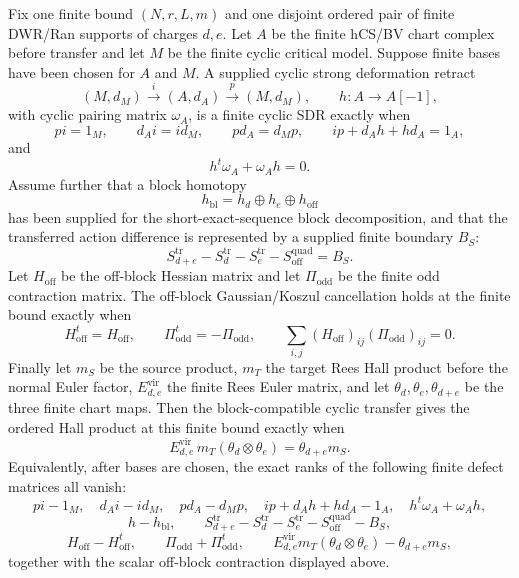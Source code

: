 \begin{proposition}
\label{prop:finite-cyclic-sdr-block-compatibility-gate}
Fix one finite bound \((N,r,L,m)\) and one disjoint ordered pair of
finite DWR/Ran supports of charges \(d,e\). Let \(A\) be the finite
hCS/BV chart complex before transfer and let \(M\) be the finite cyclic
critical model. Suppose finite bases have been chosen for \(A\) and
\(M\). A supplied cyclic strong deformation retract
\[
(M,d_M)
\xrightarrow{\ i\ }
(A,d_A)
\xrightarrow{\ p\ }
(M,d_M),
\qquad
h\colon A\to A[-1],
\]
with cyclic pairing matrix \(\omega_A\), is a finite cyclic SDR exactly
when
\[
pi=1_M,\qquad d_A i=i d_M,\qquad p d_A=d_M p,
\qquad ip+d_Ah+hd_A=1_A,
\]
and
\[
h^{t}\omega_A+\omega_Ah=0.
\]
Assume further that a block homotopy
\[
h_{\mathrm{bl}}=h_d\oplus h_e\oplus h_{\mathrm{off}}
\]
has been supplied for the short-exact-sequence block decomposition,
and that the transferred action difference is represented by a supplied
finite boundary \(B_S\):
\[
S_{d+e}^{\mathrm{tr}}-S_d^{\mathrm{tr}}-S_e^{\mathrm{tr}}
-S_{\mathrm{off}}^{\mathrm{quad}}=B_S .
\]
Let \(H_{\mathrm{off}}\) be the off-block Hessian matrix and let
\(\Pi_{\mathrm{odd}}\) be the finite odd contraction matrix. The
off-block Gaussian/Koszul cancellation holds at the finite bound
exactly when
\[
H_{\mathrm{off}}^t=H_{\mathrm{off}},\qquad
\Pi_{\mathrm{odd}}^t=-\Pi_{\mathrm{odd}},\qquad
\sum_{i,j}(H_{\mathrm{off}})_{ij}(\Pi_{\mathrm{odd}})_{ij}=0.
\]
Finally let \(m_S\) be the source product, \(m_T\) the target Rees
Hall product before the normal Euler factor, \(E_{d,e}^{\mathrm{vir}}\)
the finite Rees Euler matrix, and let
\(\theta_d,\theta_e,\theta_{d+e}\) be the three finite chart maps.
Then the block-compatible cyclic transfer gives the ordered Hall
product at this finite bound exactly when
\[
E_{d,e}^{\mathrm{vir}}\,
m_T(\theta_d\otimes\theta_e)
=
\theta_{d+e}m_S .
\]
Equivalently, after bases are chosen, the exact ranks of the following
finite defect matrices all vanish:
\[
pi-1_M,\quad d_A i-i d_M,\quad p d_A-d_M p,\quad
ip+d_Ah+hd_A-1_A,\quad h^t\omega_A+\omega_Ah,
\]
\[
h-h_{\mathrm{bl}},\qquad
S_{d+e}^{\mathrm{tr}}-S_d^{\mathrm{tr}}-S_e^{\mathrm{tr}}
-S_{\mathrm{off}}^{\mathrm{quad}}-B_S,
\]
\[
H_{\mathrm{off}}-H_{\mathrm{off}}^t,\qquad
\Pi_{\mathrm{odd}}+\Pi_{\mathrm{odd}}^t,\qquad
E_{d,e}^{\mathrm{vir}}m_T(\theta_d\otimes\theta_e)
-\theta_{d+e}m_S,
\]
together with the scalar off-block contraction displayed above.
\end{proposition}

